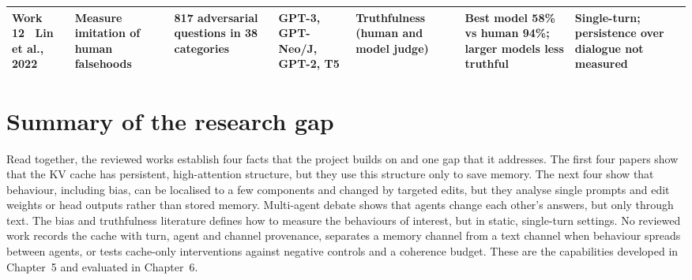 \begin{landscape}
\begin{longtable}{|L{2.2cm}|L{2.6cm}|L{3.5cm}|L{2.7cm}|L{3.0cm}|L{2.9cm}|L{3.3cm}|}
Work 12~\cite{lin2022truthfulqa} Lin et al., 2022 & Measure imitation of human falsehoods & 817 adversarial questions in 38 categories & GPT-3, GPT-Neo/J, GPT-2, T5 & Truthfulness (human and model judge) & Best model 58\% vs human 94\%; larger models less truthful & Single-turn; persistence over dialogue not measured\\\hline
\end{longtable}\endgroup
\end{landscape}
\clearpage

\section{Summary of the research gap}
Read together, the reviewed works establish four facts that the project builds on and one gap that it addresses. The first four papers show that the KV cache has persistent, high-attention structure, but they use this structure only to save memory. The next four show that behaviour, including bias, can be localised to a few components and changed by targeted edits, but they analyse single prompts and edit weights or head outputs rather than stored memory. Multi-agent debate shows that agents change each other's answers, but only through text. The bias and truthfulness literature defines how to measure the behaviours of interest, but in static, single-turn settings. No reviewed work records the cache with turn, agent and channel provenance, separates a memory channel from a text channel when behaviour spreads between agents, or tests cache-only interventions against negative controls and a coherence budget. These are the capabilities developed in Chapter~5 and evaluated in Chapter~6.
